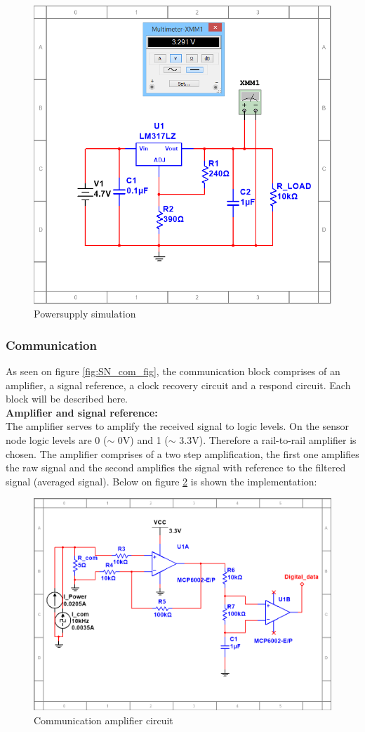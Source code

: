 \begin{figure}[H]
	\centering
	\includegraphics[width=.5\textwidth]{billeder/PS_lm317_sim}
	\caption{Powersupply simulation}
	\label{fig:ps_sim}
\end{figure}

\subsubsection{Communication}
As seen on figure \ref{fig:SN_com_fig}, the communication block comprises of an amplifier, a signal reference, a clock recovery circuit and a respond circuit. Each block will be described here.\\
\textbf{Amplifier and signal reference:}\\
The amplifier serves to amplify the received signal to logic levels. On the sensor node logic levels are 0 ($\sim$ 0V) and 1 ($\sim$ 3.3V). Therefore a rail-to-rail amplifier is chosen. The amplifier comprises of a two step amplification, the first one amplifies the raw signal and the second amplifies the signal with reference to the filtered signal (averaged signal). Below on figure \ref{fig:communication_amplifier_circuit} is shown the implementation:

\begin{figure}[H]
	\centering
	\includegraphics[width=.6\textwidth]{billeder/communication_amplifier_sn}
	\caption{Communication amplifier circuit}
	\label{fig:communication_amplifier_circuit}
\end{figure}

